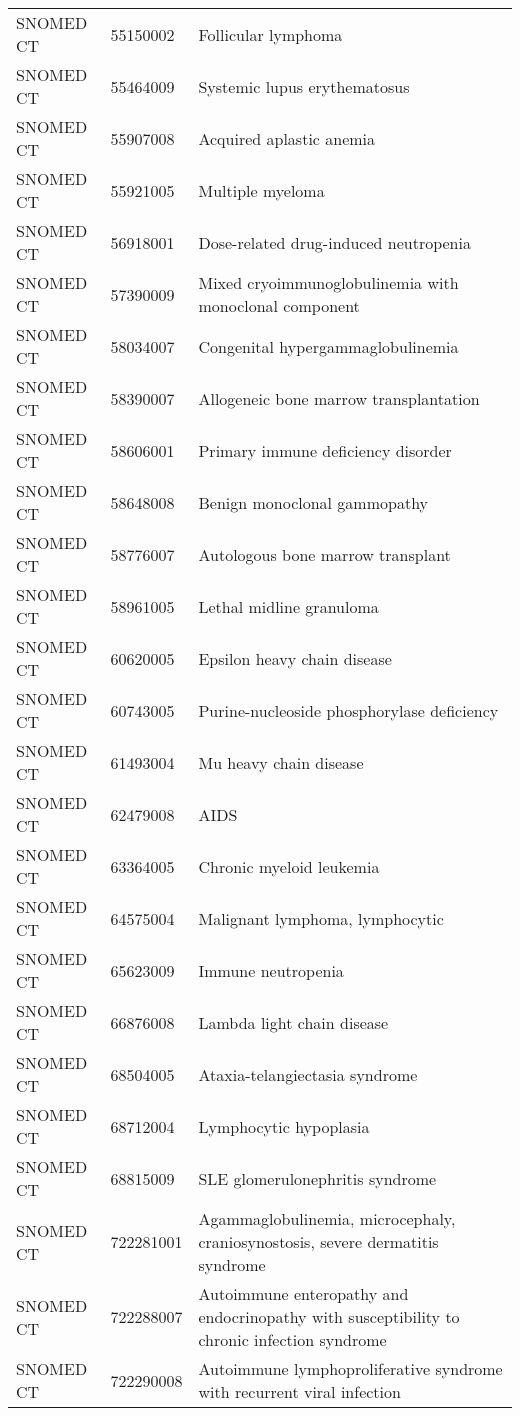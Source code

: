 \begin{longtable}{p{}p{}p{}}
  SNOMED CT & 55150002 & Follicular lymphoma \\ 
  SNOMED CT & 55464009 & Systemic lupus erythematosus \\ 
  SNOMED CT & 55907008 & Acquired aplastic anemia \\ 
  SNOMED CT & 55921005 & Multiple myeloma \\ 
  SNOMED CT & 56918001 & Dose-related drug-induced neutropenia \\ 
  SNOMED CT & 57390009 & Mixed cryoimmunoglobulinemia with monoclonal component \\ 
  SNOMED CT & 58034007 & Congenital hypergammaglobulinemia \\ 
  SNOMED CT & 58390007 & Allogeneic bone marrow transplantation \\ 
  SNOMED CT & 58606001 & Primary immune deficiency disorder \\ 
  SNOMED CT & 58648008 & Benign monoclonal gammopathy \\ 
  SNOMED CT & 58776007 & Autologous bone marrow transplant \\ 
  SNOMED CT & 58961005 & Lethal midline granuloma \\ 
  SNOMED CT & 60620005 & Epsilon heavy chain disease \\ 
  SNOMED CT & 60743005 & Purine-nucleoside phosphorylase deficiency \\ 
  SNOMED CT & 61493004 & Mu heavy chain disease \\ 
  SNOMED CT & 62479008 & AIDS \\ 
  SNOMED CT & 63364005 & Chronic myeloid leukemia \\ 
  SNOMED CT & 64575004 & Malignant lymphoma, lymphocytic \\ 
  SNOMED CT & 65623009 & Immune neutropenia \\ 
  SNOMED CT & 66876008 & Lambda light chain disease \\ 
  SNOMED CT & 68504005 & Ataxia-telangiectasia syndrome \\ 
  SNOMED CT & 68712004 & Lymphocytic hypoplasia \\ 
  SNOMED CT & 68815009 & SLE glomerulonephritis syndrome \\ 
  SNOMED CT & 722281001 & Agammaglobulinemia, microcephaly, craniosynostosis, severe dermatitis syndrome \\ 
  SNOMED CT & 722288007 & Autoimmune enteropathy and endocrinopathy with susceptibility to chronic infection syndrome \\ 
  SNOMED CT & 722290008 & Autoimmune lymphoproliferative syndrome with recurrent viral infection \\ 

\end{longtable}
